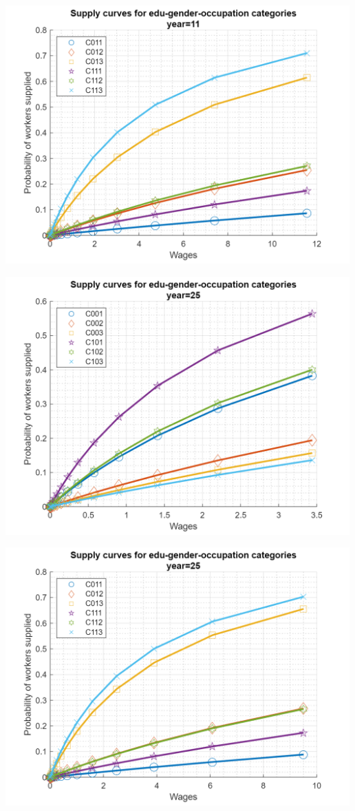 \documentclass[
]{book}
\begin{document}
\includegraphics[width=5.20833in,height=\textheight]{img/bfwx_mlogit_images/figure_5.png}

\includegraphics[width=5.20833in,height=\textheight]{img/bfwx_mlogit_images/figure_6.png}

\includegraphics[width=5.20833in,height=\textheight]{img/bfwx_mlogit_images/figure_7.png}
\end{document}
